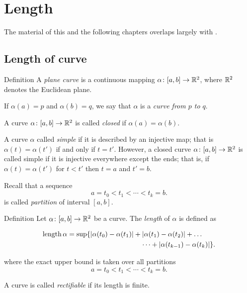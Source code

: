 \chapter{Length}

The material of this and the following chapters overlaps largely with \cite[Chapter 5]{fuchs-tabachnikov}.

\section{Length of curve}


\begin{thm}{Definition}\label{def:curve}
A \emph{plane curve} is a continuous mapping $\alpha\:[a,b]\z\to \RR^2$,
where $\mathbb{R}^2$ denotes the Euclidean plane. 


If $\alpha(a)=p$ and $\alpha(b)=q$,
we say that $\alpha$ is a \emph{curve from $p$ to $q$}.

A curve $\alpha\colon[a,b]\to \mathbb{R}^2$ is called \emph{closed} if $\alpha(a)=\alpha(b)$.

A curve $\alpha$ called \emph{simple} if it is described by an injective map;
that is $\alpha(t)=\alpha(t')$ if and only if $t=t'$.
However, a closed curve $\alpha\colon[a,b]\to \mathbb{R}^2$ is called simple if it is injective 
everywhere except the ends; that is, if
$\alpha(t)=\alpha(t')$ for $t<t'$ then $t=a$ and $t'=b$.
\end{thm}
 
Recall that a sequence 
\[a=t_0 < t_1 < \cdots < t_k=b.\]
is called \emph{partition} of interval $[a,b]$.

\begin{thm}{Definition}\label{def:length}
Let $\alpha\colon[a,b]\to \mathbb{R}^2$ be a curve.
The \emph{length} of $\alpha$ is defined as

\begin{align*}
\length \alpha
&= 
\sup \{|\alpha(t_0)-\alpha(t_1)|+|\alpha(t_1)-\alpha(t_2)|+\dots
\\
&\ \ \ \ \ \ \ \ \ \ \ \ \ \ \ \ \ \ \ \ \ \ \ \ \ \ \ \ \ \ \ \ \dots+|\alpha(t_{k-1})-\alpha(t_k)|\}. 
\end{align*}

where the exact upper bound is taken over all partitions
\[a=t_0 < t_1 < \cdots < t_k=b.\]

A curve is called \emph{rectifiable} if its length is finite.
\end{thm}

